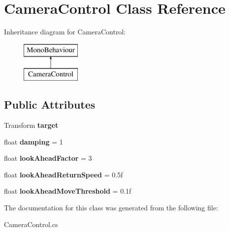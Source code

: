 \hypertarget{class_camera_control}{}\section{Camera\+Control Class Reference}
\label{class_camera_control}
Inheritance diagram for Camera\+Control\+:\begin{figure}[H]
\begin{center}
\leavevmode
\includegraphics[height=2.000000cm]{class_camera_control}
\end{center}
\end{figure}
\subsection*{Public Attributes}
\begin{DoxyCompactItemize}
\item 
\hypertarget{class_camera_control_a68ca17e97e355b5f391ae4cb11a19680}{}\label{class_camera_control_a68ca17e97e355b5f391ae4cb11a19680} 
Transform {\bfseries target}
\item 
\hypertarget{class_camera_control_a700414c60a426ab8938073d2136974f0}{}\label{class_camera_control_a700414c60a426ab8938073d2136974f0} 
float {\bfseries damping} = 1
\item 
\hypertarget{class_camera_control_a37efa13f7e37cb8ce7e404731605ae17}{}\label{class_camera_control_a37efa13f7e37cb8ce7e404731605ae17} 
float {\bfseries look\+Ahead\+Factor} = 3
\item 
\hypertarget{class_camera_control_acac3aa9575babfcf9e2ccb5aee7f9eb9}{}\label{class_camera_control_acac3aa9575babfcf9e2ccb5aee7f9eb9} 
float {\bfseries look\+Ahead\+Return\+Speed} = 0.\+5f
\item 
\hypertarget{class_camera_control_afe31c94a50cb639ba7bf8fa4815299ff}{}\label{class_camera_control_afe31c94a50cb639ba7bf8fa4815299ff} 
float {\bfseries look\+Ahead\+Move\+Threshold} = 0.\+1f
\end{DoxyCompactItemize}


The documentation for this class was generated from the following file\+:\begin{DoxyCompactItemize}
\item 
Camera\+Control.\+cs\end{DoxyCompactItemize}
